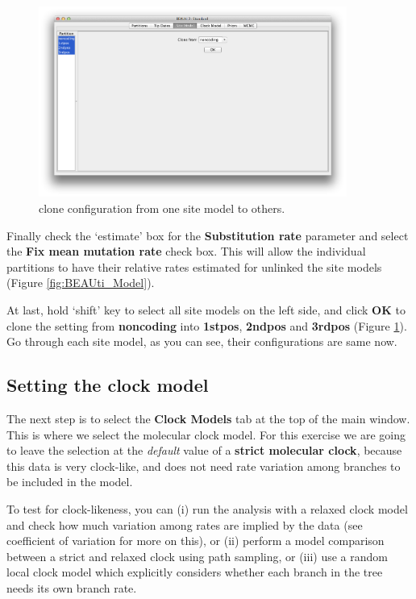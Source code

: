 \documentclass[11pt]{article}
\theoremstyle{plain}%
\theoremstyle{definition}
\theoremstyle{remark}
\begin{document}
\begin{figure}
\centering	
\includegraphics[width=0.9\textwidth]{figures/cloneFrom}
\caption{clone configuration from one site model to others.}
\label{fig:cloneFrom}
\end{figure}

Finally check the `estimate' box for the \textbf{Substitution rate} parameter and select the \textbf{Fix mean mutation rate} check box. This will allow the individual partitions to have their relative rates estimated for unlinked the site models (Figure \ref{fig:BEAUti_Model}).


At last, hold `shift' key to select all site models on the left side, and click \textbf{OK} to clone the setting from \textbf{noncoding} into \textbf{1stpos}, \textbf{2ndpos} and \textbf{3rdpos} (Figure \ref{fig:cloneFrom}). Go through each site model, as you can see, their configurations are same now. 


\subsection{Setting the clock model}

The next step is to select the {\bf Clock Models} tab at the top of the
main window. This is where we select the molecular clock model. For this exercise we are going to leave the selection at the {\it default} value of a \textbf{strict molecular clock}, because this data is very clock-like, and does not need rate variation among branches to be included in the model.

To test for clock-likeness, you can (i) run the analysis with
a relaxed clock model and check how much variation among rates are implied
by the data (see coefficient of variation for more on this), or
(ii) perform a model comparison between a strict and relaxed clock using path
sampling, or (iii) use a random local clock model \cite{drummond2010bayesian}
which explicitly considers whether each branch in the tree needs its own branch
rate.
\end{document}
